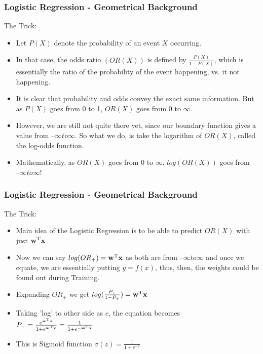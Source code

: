 \begin{frame}[fragile]\frametitle{Logistic Regression - Geometrical Background}
The Trick:
\begin{itemize}
\item 
Let $P(X)$ denote the probability of an event $X$ occurring. 
\item In that case, the odds ratio $(OR(X))$ is defined by  $\frac{P(X)}{1-P(X)}$, which is essentially the ratio of the probability of the event happening, vs. it not happening. 
\item It is clear that probability and odds convey the exact same information. But as $P(X)$ goes from 0 to 1, $OR(X)$ goes from 0 to $\infty$.
\item 
However, we are still not quite there yet, since our boundary function gives a value from $–\infty to \infty$. So what we do, is take the logarithm of $OR(X)$, called the log-odds function. 
\item Mathematically, as $OR(X)$ goes from 0 to $\infty$, $log(OR(X))$ goes from $–\infty to \infty$!

\end{itemize}

\end{frame}

\begin{frame}[fragile]\frametitle{Logistic Regression - Geometrical Background}
The Trick:
\begin{itemize}
\item Main idea of the Logistic Regression is to be able to predict $OR(X)$ with just $\textbf{w}^\text{T}\textbf x$
\item Now we can say $log(OR_+) = \textbf{w}^\text{T}\textbf x$ as both are from $–\infty to \infty$ and once we equate, we are essentially putting $y = f(x)$, thus, then, the weights could be found out during Training.
\item Expanding $OR_+$ we get $log (\frac{P_+}{1-P_+}) = \textbf{w}^\text{T}\textbf x$
\item Taking 'log' to other side as $e$, the equation becomes $P_+ = \frac{e^{\textbf{w}^\text{T}\textbf x}}{1+ e^{\textbf{w}^\text{T}\textbf x}} = \frac{1}{1 + e^{-\textbf{w}^\text{T}\textbf x}}$
\item This is Sigmoid function $\sigma(z) = \frac{1}{1+e^{-z}}$
\end{itemize}

\end{frame}


